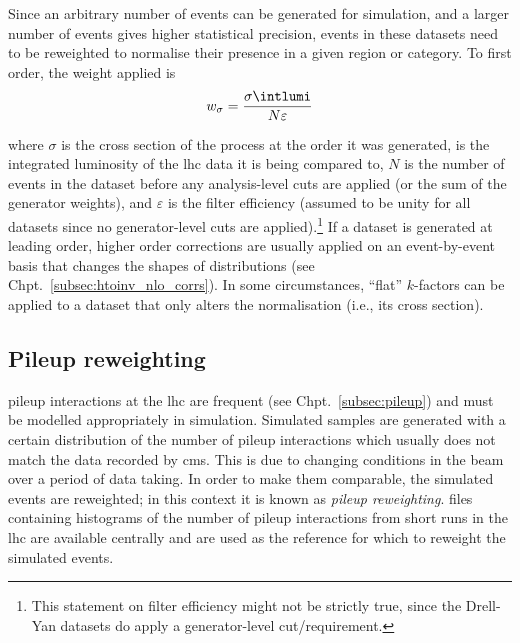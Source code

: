 Since an arbitrary number of events can be generated for simulation, and a larger number of events gives higher statistical precision, events in these datasets need to be reweighted to normalise their presence in a given region or category. To first order, the weight applied is
\begin{equation}
    w_{\sigma} = \frac{ \sigma \intlumi }{ N \varepsilon }
    \label{eq:xs_weight}
\end{equation}

where $\sigma$ is the cross section of the process at the order it was generated, \intlumi is the integrated luminosity of the \acrshort{lhc} data it is being compared to, $N$ is the number of events in the dataset before any analysis-level cuts are applied (or the sum of the generator weights), and $\varepsilon$ is the filter efficiency (assumed to be unity for all datasets since no generator-level cuts are applied).\footnote{This statement on filter efficiency might not be strictly true, since the Drell-Yan datasets do apply a generator-level cut/requirement.} If a dataset is generated at leading order, higher order corrections are usually applied on an event-by-event basis that changes the shapes of distributions (see Chpt.~\ref{subsec:htoinv_nlo_corrs}). In some circumstances, ``flat'' $k$-factors can be applied to a dataset that only alters the normalisation (i.e., its cross section).




\subsection{Pileup reweighting}
\label{subsec:pu_reweighting}

\Gls{pileup} interactions at the \acrshort{lhc} are frequent (see Chpt.~\ref{subsec:pileup}) and must be modelled appropriately in simulation. Simulated samples are generated with a certain distribution of the number of \gls{pileup} interactions which usually does not match the data recorded by \acrshort{cms}. This is due to changing conditions in the beam over a period of data taking. In order to make them comparable, the simulated events are reweighted; in this context it is known as \emph{\gls{pileup} reweighting}. \ROOT files containing histograms of the number of \gls{pileup} interactions from short runs in the \acrshort{lhc} are available centrally and are used as the reference for which to reweight the simulated events.


